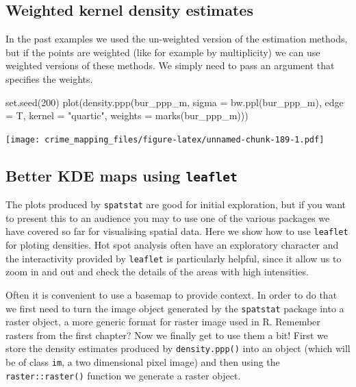 \documentclass[
  krantz2]{krantz}
\makeatletter
\newenvironment{Shaded}{\begin{snugshade}}{\end{snugshade}}
\newcommand{\AttributeTok}[1]{\textcolor[rgb]{0.61,0.61,0.61}{#1}}
\newcommand{\DecValTok}[1]{\textcolor[rgb]{0.06,0.06,0.06}{#1}}
\newcommand{\FunctionTok}[1]{\textcolor[rgb]{0,0,0}{#1}}
\newcommand{\NormalTok}[1]{#1}
\newcommand{\StringTok}[1]{\textcolor[rgb]{0.5,0.5,0.5}{#1}}
\newenvironment{kframe}{%
\medskip{}
\setlength{\fboxsep}{.8em}
 \def\at@end@of@kframe{}%
 \ifinner\ifhmode%
  \def\at@end@of@kframe{\end{minipage}}%
  \begin{minipage}{\columnwidth}%
 \fi\fi%
 \def\FrameCommand##1{\hskip\@totalleftmargin \hskip-\fboxsep
 \colorbox{shadecolor}{##1}\hskip-\fboxsep
     \hskip-\linewidth \hskip-\@totalleftmargin \hskip\columnwidth}%
 \MakeFramed {\advance\hsize-\width
   \@totalleftmargin\z@ \linewidth\hsize
   \@setminipage}}%
 {\par\unskip\endMakeFramed%
 \at@end@of@kframe}
\renewenvironment{Shaded}{\begin{kframe}}{\end{kframe}}
\makeatother
\begin{document}
\hypertarget{weighted-kernel-density-estimates}{%
\subsection{Weighted kernel density estimates}\label{weighted-kernel-density-estimates}}

In the past examples we used the un-weighted version of the estimation methods, but if the points are weighted (like for example by multiplicity) we can use weighted versions of these methods. We simply need to pass an argument that specifies the weights.

\begin{Shaded}
\begin{Highlighting}[]
\FunctionTok{set.seed}\NormalTok{(}\DecValTok{200}\NormalTok{)}
\FunctionTok{plot}\NormalTok{(}\FunctionTok{density.ppp}\NormalTok{(bur\_ppp\_m, }\AttributeTok{sigma =} \FunctionTok{bw.ppl}\NormalTok{(bur\_ppp\_m), }\AttributeTok{edge =}\NormalTok{ T, }
                 \AttributeTok{kernel =} \StringTok{"quartic"}\NormalTok{,}
                 \AttributeTok{weights =} \FunctionTok{marks}\NormalTok{(bur\_ppp\_m)))}
\end{Highlighting}
\end{Shaded}

\texttt{[image: crime\_mapping\_files/figure-latex/unnamed-chunk-189-1.pdf]}

\hypertarget{better-kde-maps-using-leaflet}{%
\subsection{\texorpdfstring{Better KDE maps using \texttt{leaflet}}{Better KDE maps using leaflet}}\label{better-kde-maps-using-leaflet}}

The plots produced by \texttt{spatstat} are good for initial exploration, but if you want to present this to an audience you may to use one of the various packages we have covered so far for visualising spatial data. Here we show how to use \texttt{leaflet} for ploting densities. Hot spot analysis often have an exploratory character and the interactivity provided by \texttt{leaflet} is particularly helpful, since it allow us to zoom in and out and check the details of the areas with high intensities.

Often it is convenient to use a basemap to provide context. In order to do that we first need to turn the image object generated by the \texttt{spatstat} package into a raster object, a more generic format for raster image used in R. Remember rasters from the first chapter? Now we finally get to use them a bit! First we store the density estimates produced by \texttt{density.ppp()} into an object (which will be of class \texttt{im}, a two dimensional pixel image) and then using the \texttt{raster::raster()} function we generate a raster object.
\end{document}
